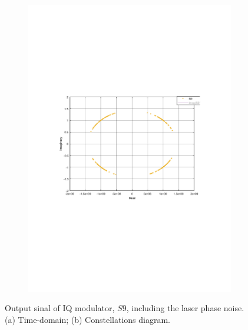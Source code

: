\begin{refsection}
\begin{figure}[h!]
\begin{subfigure}{.5\textwidth}
  \caption{}
  \label{fig:sub1}
\end{subfigure}%
\begin{subfigure}{.5\textwidth}
  \centering
  \includegraphics[width=\linewidth]{./sdf/dsp_laser_phase_compensation/figures/S9_constl.pdf}
  \caption{}
  \label{fig:sub2}
\end{subfigure}
\caption{Output sinal of IQ modulator, $S9$, including the laser phase noise. (a) Time-domain; (b) Constellations diagram.}
\label{fig_s9}
\end{figure}



\end{refsection}
